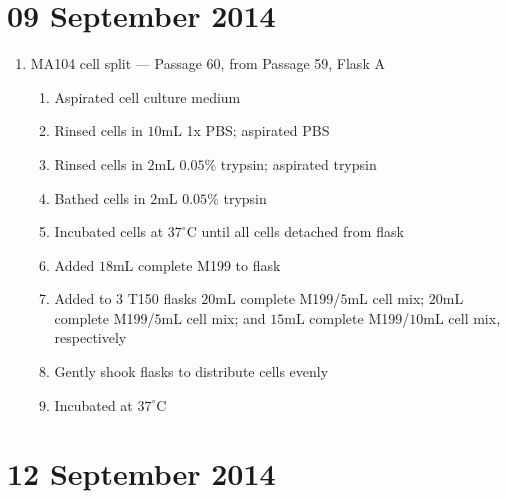 
\section*{09 September 2014}

\begin{enumerate}
	\item MA104 cell split --- Passage 60, from Passage 59, Flask A
		\begin{enumerate}
			\item Aspirated cell culture medium
			\item Rinsed cells in $10$mL 1x PBS; aspirated PBS
			\item Rinsed cells in $2$mL $0.05$\% trypsin; aspirated trypsin
			\item Bathed cells in $2$mL $0.05$\% trypsin
			\item Incubated cells at $37^{\circ}$C until all cells detached from flask
			\item Added $18$mL complete M199 to flask
			\item Added to $3$ T150 flasks $20$mL complete M199/$5$mL cell mix; $20$mL complete M199/$5$mL cell mix; and $15$mL complete M199/$10$mL cell mix, respectively
			\item Gently shook flasks to distribute cells evenly
			\item Incubated at $37^{\circ}$C
		\end{enumerate}
\end{enumerate}

\section*{12 September 2014}


